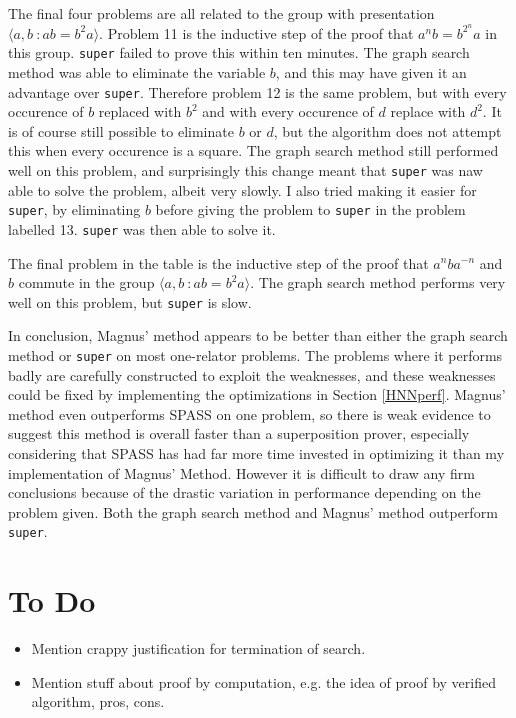 \documentclass[12pt]{article} %
\theoremstyle{definition}
\theoremstyle{definition}
\theoremstyle{definition}
\theoremstyle{definition}
\theoremstyle{definition}
\theoremstyle{definition}
\begin{document}
The final four problems are all related to the group with presentation
$\langle a, b \ : ab = b^2a\rangle$. Problem 11 is the inductive step
of the proof that $a^nb = b^{2^n}a$ in this group. \lstinline{super} failed to prove this
within ten minutes. The graph search method was able to eliminate the variable
$b$, and this may have given it an advantage over \lstinline{super}. Therefore problem 12
is the same problem, but with every occurence of $b$ replaced with $b^2$ and
with every occurence of $d$ replace with $d^2$. It is of course still possible
to eliminate $b$ or $d$, but the algorithm does not attempt this when every occurence
is a square. The graph search method still performed well on this problem, and
surprisingly this change meant that \lstinline{super} was naw able to solve the problem, albeit
very slowly. I also tried making it easier for \lstinline{super}, by eliminating $b$ before giving the problem
to \lstinline{super} in the problem labelled 13. \lstinline{super} was then able to solve it.

The final problem in the table is the inductive step of the proof that
$a^nba^{-n}$ and $b$ commute in the group $\langle a, b \ : ab = b^2a\rangle$.
The graph search method performs very well on this problem, but \lstinline{super} is slow.

In conclusion, Magnus' method appears to be better than either the graph search method
or \lstinline{super} on most one-relator problems. The problems where it performs badly are
carefully constructed to exploit the weaknesses, and these weaknesses could be fixed
by implementing the optimizations in Section \ref{HNNperf}. Magnus' method even
outperforms SPASS on one problem, so there is weak evidence to suggest this method
is overall faster than a superposition prover, especially considering that SPASS
has had far more time invested in optimizing it than my implementation of Magnus'
Method. However it is difficult to draw any firm conclusions because of the drastic variation
in performance depending on the problem given. Both the graph
search method and Magnus' method outperform \lstinline{super}.

\section{To Do}
\begin{itemize}
  \item Mention crappy justification for termination of search.
  \item Mention stuff about proof by computation, e.g. the idea of
    proof by verified algorithm, pros, cons.
\end{itemize}


\end{document}

